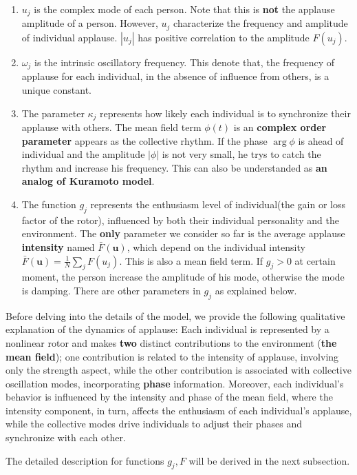 \documentclass[UTF8,a4paper,11pt]{ctexart}
\begin{document}
\begin{enumerate}
    \item $u_j$ is the complex mode of each person. Note that this is \textbf{not} the applause amplitude of a person. However, $u_j$ characterize the frequency and amplitude of individual applause. $|u_j|$ has positive correlation to the amplitude $F(u_j)$.
    \item $ω_j$ is the intrinsic oscillatory frequency. This denote that, the frequency of applause for each individual, in the absence of influence from others, is a unique constant.
    \item The parameter $κ_j$ represents how likely each individual is to synchronize their applause with others. The mean field term $ϕ(t)$ is an \textbf{complex order parameter} appears as the collective rhythm. If the phase $\arg{ϕ}$ is ahead of individual and the amplitude $|ϕ|$ is not very small, he trys to catch the rhythm and increase his frequency. This can also be understanded as \textbf{an analog of Kuramoto model}.
    \item The function $g_j$ represents the enthusiasm level of individual(the gain or loss factor of the rotor), influenced by both their individual personality and the environment. The \textbf{only} parameter we consider so far is the average applause \textbf{intensity} named $\bar{F}(𝐮)$, which depend on the individual intensity $\bar{F}(𝐮) = \frac{1}{N}\sum_j F(u_j)$. This is also a mean field term. If $g_j>0$ at certain moment, the person increase the amplitude of his mode, otherwise the mode is damping. There are other parameters in $g_j$ as explained below.
\end{enumerate}

Before delving into the details of the model, we provide the following qualitative explanation of the dynamics of applause: Each individual is represented by a nonlinear rotor and makes \textbf{two} distinct contributions to the environment (\textbf{the mean field}); one contribution is related to the intensity of applause, involving only the strength aspect, while the other contribution is associated with collective oscillation modes, incorporating \textbf{phase} information. Moreover, each individual's behavior is influenced by the intensity and phase of the mean field, where the intensity component, in turn, affects the enthusiasm of each individual's applause, while the collective modes drive individuals to adjust their phases and synchronize with each other.

The detailed description for functions $g_j,F$ will  be derived in the next subsection.
\end{document}
